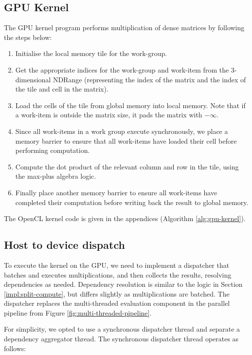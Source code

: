 \subsection{GPU Kernel} \label{impl:gpu-kernel}

The GPU kernel program performs multiplication of dense matrices by following the steps below:
\begin{enumerate}
  \item Initialise the local memory tile for the work-group.
  \item Get the appropriate indices for the work-group and work-item from the 3-dimensional NDRange (representing 
    the index of the matrix and the index of the tile and cell in the matrix).
  \item Load the cells of the tile from global memory into local memory. Note that if a work-item is 
    outside the matrix size, it pads the matrix with $-\infty$.
  \item Since all work-items in a work group execute synchronously, we place a memory barrier to ensure that all 
    work-items have loaded their cell before performing computation.
  \item Compute the dot product of the relevant column and row in the tile, using the max-plus algebra logic.
  \item Finally place another memory barrier to ensure all work-items have completed their computation before writing 
    back the result to global memory.
\end{enumerate}

The OpenCL kernel code is given in the appendices (Algorithm \ref{alg:gpu-kernel}).

\subsection{Host to device dispatch}


To execute the kernel on the GPU, we need to implement a dispatcher that batches and executes multiplications,
and then collects the results, resolving dependencies as needed. Dependency resolution is similar to the logic in 
Section \ref{impl:split-compute}, but differs slightly as multiplications are batched.
The dispatcher replaces the multi-threaded evaluation component in the parallel pipeline from Figure \ref{fig:multi-threaded-pipeline}.

For simplicity, we opted to use a synchronous dispatcher thread and separate a dependency aggregator thread. 
The synchronous dispatcher thread operates as follows:

